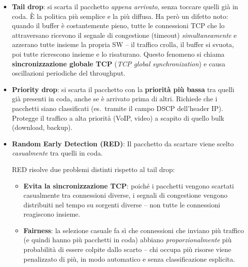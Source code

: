 \documentclass[a4paper,12pt]{report}
\begin{document}
\begin{itemize}
    \item \textbf{Tail drop}: si scarta il pacchetto \emph{appena
          arrivato}, senza toccare quelli già in coda. È la politica
          più semplice e la più diffusa. Ha però un difetto noto:
          quando il buffer è costantemente pieno, tutte le connessioni
          TCP che lo attraversano ricevono il segnale di congestione
          (timeout) \emph{simultaneamente} e azzerano tutte insieme
          la propria SW -- il traffico crolla, il buffer si svuota,
          poi tutte ricrescono insieme e lo risaturano. Questo
          fenomeno si chiama \textbf{sincronizzazione globale TCP}
          (\textit{TCP global synchronization}) e causa oscillazioni
          periodiche del throughput.

    \item \textbf{Priority drop}: si scarta il pacchetto con la
          \textbf{priorità più bassa} tra quelli già presenti in coda,
          anche se è arrivato prima di altri. Richiede che i pacchetti
          siano classificati (es.\ tramite il campo DSCP dell'header
          IP). Protegge il traffico a alta priorità (VoIP, video) a
          scapito di quello bulk (download, backup).

    \item \textbf{Random Early Detection (RED)}:  Il pacchetto da scartare
          viene scelto \emph{casualmente} tra quelli in coda.

          RED risolve due problemi distinti rispetto al tail drop:
          \begin{itemize}
              \item \textbf{Evita la sincronizzazione TCP}: poiché i
                    pacchetti vengono scartati casualmente tra
                    connessioni diverse, i segnali di congestione
                    vengono distribuiti nel tempo su sorgenti diverse
                    -- non tutte le connessioni reagiscono insieme.
              \item \textbf{Fairness}: la selezione casuale fa sì che
                    connessioni che inviano più traffico (e quindi
                    hanno più pacchetti in coda) abbiano
                    \emph{proporzionalmente} più probabilità di essere
                    colpite dallo scarto -- chi occupa più risorse
                    viene penalizzato di più, in modo automatico e
                    senza classificazione esplicita.
          \end{itemize}
\end{itemize}
\newpage
\end{document}
